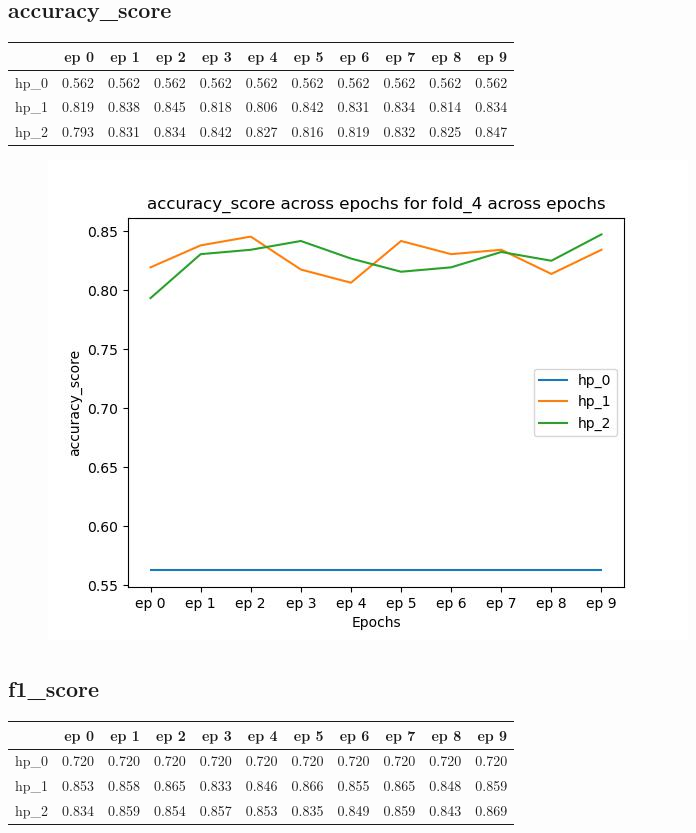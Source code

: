 \documentclass{article}
\begin{document}
\subsection{accuracy\_score}
\begin{tabular}{lrrrrrrrrrr}
\toprule
{} &   ep 0 &   ep 1 &   ep 2 &   ep 3 &   ep 4 &   ep 5 &   ep 6 &   ep 7 &   ep 8 &   ep 9 \\
\midrule
hp\_0 &  0.562 &  0.562 &  0.562 &  0.562 &  0.562 &  0.562 &  0.562 &  0.562 &  0.562 &  0.562 \\
hp\_1 &  0.819 &  0.838 &  0.845 &  0.818 &  0.806 &  0.842 &  0.831 &  0.834 &  0.814 &  0.834 \\
hp\_2 &  0.793 &  0.831 &  0.834 &  0.842 &  0.827 &  0.816 &  0.819 &  0.832 &  0.825 &  0.847 \\
\bottomrule
\end{tabular}

\begin{figure}[H]
\includegraphics[scale = 0.75]{fold_4/accuracy_score}
\end{figure}
\subsection{f1\_score}
\begin{tabular}{lrrrrrrrrrr}
\toprule
{} &   ep 0 &   ep 1 &   ep 2 &   ep 3 &   ep 4 &   ep 5 &   ep 6 &   ep 7 &   ep 8 &   ep 9 \\
\midrule
hp\_0 &  0.720 &  0.720 &  0.720 &  0.720 &  0.720 &  0.720 &  0.720 &  0.720 &  0.720 &  0.720 \\
hp\_1 &  0.853 &  0.858 &  0.865 &  0.833 &  0.846 &  0.866 &  0.855 &  0.865 &  0.848 &  0.859 \\
hp\_2 &  0.834 &  0.859 &  0.854 &  0.857 &  0.853 &  0.835 &  0.849 &  0.859 &  0.843 &  0.869 \\
\bottomrule
\end{tabular}
\end{document}
